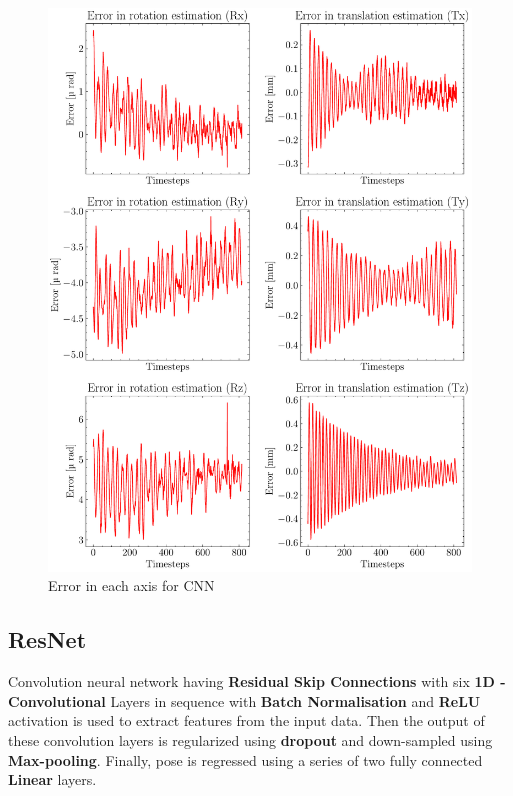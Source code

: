 \begin{figure}[H]
    \centering
    \includegraphics[scale=0.65]{images/fig_chapter4/nn_related/error_in_predicted_vs_ground_truth_cnn.pdf}
    \caption{Error in each axis for CNN}
    \label{fig:cnn_error}
\end{figure}

\subsection{ResNet}
Convolution neural network having \textbf{Residual Skip Connections} with six \textbf{1D - Convolutional} Layers in sequence with \textbf{Batch Normalisation} and  \textbf{ReLU} activation is used to extract features from the input data. Then the output of these convolution layers is regularized using \textbf{dropout} and down-sampled using \textbf{Max-pooling}. Finally, pose is regressed using a series of two fully connected \textbf{Linear} layers. 

